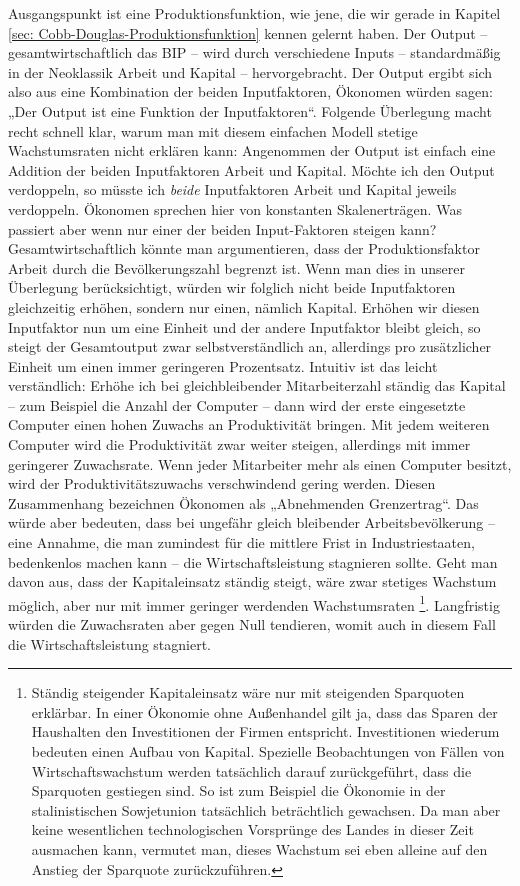 Ausgangspunkt ist eine Produktionsfunktion, wie jene, die wir gerade in Kapitel \ref{sec: Cobb-Douglas-Produktionsfunktion} kennen gelernt haben.  Der Output – gesamtwirtschaftlich das BIP – wird durch verschiedene Inputs – standardmäßig in der Neoklassik Arbeit und Kapital – hervorgebracht. Der Output ergibt sich also aus eine Kombination der beiden Inputfaktoren, Ökonomen würden sagen: „Der Output ist eine Funktion der Inputfaktoren“. 
Folgende Überlegung macht recht schnell klar, warum man mit diesem einfachen Modell stetige Wachstumsraten nicht erklären kann: Angenommen der Output ist einfach eine Addition der beiden Inputfaktoren Arbeit und Kapital. Möchte ich den Output verdoppeln, so müsste ich \textit{beide} Inputfaktoren Arbeit und Kapital jeweils verdoppeln. Ökonomen sprechen hier von konstanten Skalenerträgen. 
Was passiert aber wenn nur einer der beiden Input-Faktoren steigen kann? Gesamtwirtschaftlich könnte man argumentieren, dass der Produktionsfaktor Arbeit durch die Bevölkerungszahl begrenzt ist. Wenn man dies in unserer Überlegung berücksichtigt, würden wir folglich nicht beide Inputfaktoren gleichzeitig erhöhen, sondern nur einen, nämlich Kapital. Erhöhen wir diesen Inputfaktor nun um eine Einheit und der andere Inputfaktor bleibt gleich, so steigt der Gesamtoutput zwar selbstverständlich an, allerdings pro zusätzlicher Einheit um einen immer geringeren Prozentsatz. Intuitiv ist das leicht verständlich: Erhöhe ich bei gleichbleibender Mitarbeiterzahl ständig das Kapital – zum Beispiel die Anzahl der Computer – dann wird der erste eingesetzte Computer einen hohen Zuwachs an Produktivität bringen. Mit jedem weiteren Computer wird die Produktivität zwar weiter steigen, allerdings mit immer geringerer Zuwachsrate. Wenn jeder Mitarbeiter mehr als einen Computer besitzt, wird der Produktivitätszuwachs verschwindend gering werden. Diesen Zusammenhang bezeichnen Ökonomen als „Abnehmenden Grenzertrag“.
Das würde aber bedeuten, dass bei ungefähr gleich bleibender Arbeitsbevölkerung – eine Annahme, die man zumindest für die mittlere Frist in Industriestaaten, bedenkenlos machen kann – die Wirtschaftsleistung stagnieren sollte. Geht man davon aus, dass der Kapitaleinsatz ständig steigt, wäre zwar stetiges Wachstum möglich, aber nur mit immer geringer werdenden Wachstumsraten \footnote{Ständig steigender Kapitaleinsatz wäre nur mit steigenden Sparquoten erklärbar. In einer Ökonomie ohne Außenhandel gilt ja, dass das Sparen der Haushalten den Investitionen der Firmen entspricht. Investitionen wiederum bedeuten einen Aufbau von Kapital. Spezielle Beobachtungen von Fällen von Wirtschaftswachstum werden tatsächlich darauf zurückgeführt, dass die Sparquoten gestiegen sind. So ist zum Beispiel die Ökonomie in der stalinistischen Sowjetunion tatsächlich beträchtlich gewachsen. Da man aber keine wesentlichen technologischen Vorsprünge des Landes in dieser Zeit ausmachen kann, vermutet man, dieses Wachstum sei eben alleine auf den Anstieg der Sparquote zurückzuführen.}. Langfristig würden die Zuwachsraten aber gegen Null tendieren, womit auch in diesem Fall die Wirtschaftsleistung stagniert.

